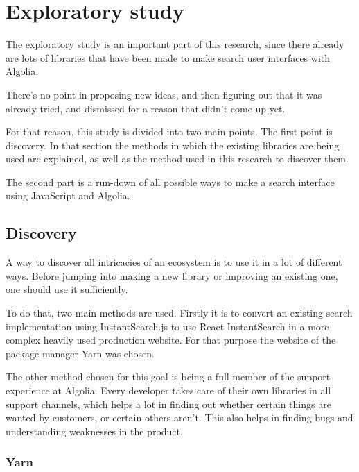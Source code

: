 
\chapter{Exploratory study} %
\label{chp:exploratory_study}

The exploratory study is an important part of this research, since there already are lots of libraries that have been made to make search user interfaces with Algolia.

There's no point in proposing new ideas, and then figuring out that it was already tried, and dismissed for a reason that didn't come up yet. 

For that reason, this study is divided into two main points. The first point is discovery. In that section the methods in which the existing libraries are being used are explained, as well as the method used in this research to discover them. 

The second part is a run-down of all possible ways to make a search interface using JavaScript and Algolia. 

\section{Discovery}
\label{sec:discovery}

A way to discover all intricacies of an ecosystem is to use it in a lot of different ways. Before jumping into making a new \gls{library} or improving an existing one, one should use it sufficiently.

To do that, two main methods are used. Firstly it is to convert an existing search implementation using InstantSearch.js\cite{instantsearch-js} to use React InstantSearch in a more complex heavily used production website. For that purpose the website of the package manager Yarn\cite{yarn-site} was chosen.

The other method chosen for this goal is being a full member of the support experience at Algolia. Every developer takes care of their own libraries in all support channels, which helps a lot in finding out whether certain things are wanted by customers, or certain others aren't. This also helps in finding bugs and understanding weaknesses in the product.

\subsection{Yarn} %
\label{ssec:yarn}

